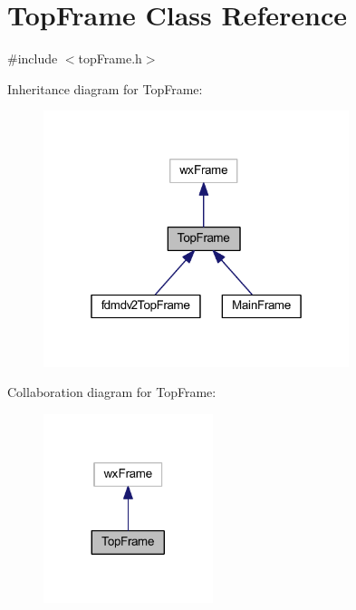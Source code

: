 \hypertarget{class_top_frame}{\section{Top\-Frame Class Reference}
\label{class_top_frame}
}


{\ttfamily \#include $<$top\-Frame.\-h$>$}



Inheritance diagram for Top\-Frame\-:\nopagebreak
\begin{figure}[H]
\begin{center}
\leavevmode
\includegraphics[width=253pt]{class_top_frame__inherit__graph}
\end{center}
\end{figure}


Collaboration diagram for Top\-Frame\-:\nopagebreak
\begin{figure}[H]
\begin{center}
\leavevmode
\includegraphics[width=140pt]{class_top_frame__coll__graph}
\end{center}
\end{figure}
